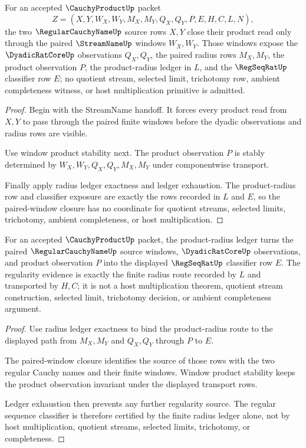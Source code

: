 \begin{theorem}
\label{thm:cauchy-product-paired-window-closure}
For an accepted $\CauchyProductUp$ packet
$$
Z=(X,Y,W_X,W_Y,M_X,M_Y,Q_X,Q_Y,P,E,H,C,L,N),
$$
the two $\RegularCauchyNameUp$ source rows $X,Y$ close their product read only through the paired $\StreamNameUp$ windows $W_X,W_Y$. Those windows expose the $\DyadicRatCoreUp$ observations $Q_X,Q_Y$, the paired radius rows $M_X,M_Y$, the product observation $P$, the product-radius ledger in $L$, and the $\RegSeqRatUp$ classifier row $E$; no quotient stream, selected limit, trichotomy row, ambient completeness witness, or host multiplication primitive is admitted.
\end{theorem}
\begin{proof}
Begin with the StreamName handoff. It forces every product read from $X,Y$ to pass through the paired finite windows before the dyadic observations and radius rows are visible.

Use window product stability next. The product observation $P$ is stably determined by $W_X,W_Y,Q_X,Q_Y,M_X,M_Y$ under componentwise transport.

Finally apply radius ledger exactness and ledger exhaustion. The product-radius row and classifier exposure are exactly the rows recorded in $L$ and $E$, so the paired-window closure has no coordinate for quotient streams, selected limits, trichotomy, ambient completeness, or host multiplication.
\end{proof}

\begin{theorem}
\label{thm:cauchy-product-radius-product-regularity}
For an accepted $\CauchyProductUp$ packet, the product-radius ledger turns the paired $\RegularCauchyNameUp$ source windows, $\DyadicRatCoreUp$ observations, and product observation $P$ into the displayed $\RegSeqRatUp$ classifier row $E$. The regularity evidence is exactly the finite radius route recorded by $L$ and transported by $H,C$; it is not a host multiplication theorem, quotient stream construction, selected limit, trichotomy decision, or ambient completeness argument.
\end{theorem}
\begin{proof}
Use radius ledger exactness to bind the product-radius route to the displayed path from $M_X,M_Y$ and $Q_X,Q_Y$ through $P$ to $E$.

The paired-window closure identifies the source of those rows with the two regular Cauchy names and their finite windows. Window product stability keeps the product observation invariant under the displayed transport rows.

Ledger exhaustion then prevents any further regularity source. The regular sequence classifier is therefore certified by the finite radius ledger alone, not by host multiplication, quotient streams, selected limits, trichotomy, or completeness.
\end{proof}

